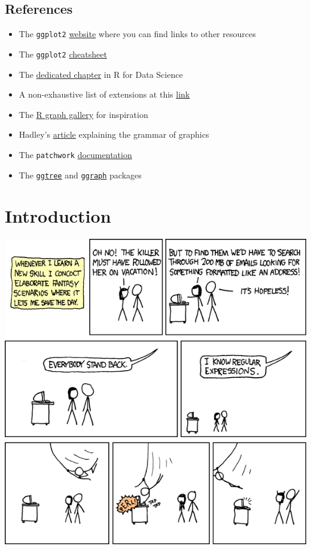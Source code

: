 \documentclass[]{book}
\providecommand{\tightlist}{%
  \setlength{\itemsep}{0pt}\setlength{\parskip}{0pt}}
\begin{document}
\hypertarget{references}{%
\section{References}\label{references}}

\begin{itemize}
\tightlist
\item
  The \texttt{ggplot2} \href{https://ggplot2.tidyverse.org/}{website} where you can find links to other resources
\item
  The \texttt{ggplot2} \href{https://rstudio.com/resources/cheatsheets/}{cheatsheet}
\item
  The \href{https://r4ds.had.co.nz/data-visualisation.html}{dedicated chapter} in R for Data Science
\item
  A non-exhaustive list of extensions at this \href{https://exts.ggplot2.tidyverse.org/gallery/}{link}
\item
  The \href{https://www.r-graph-gallery.com/}{R graph gallery} for inspiration
\item
  Hadley's \href{https://vita.had.co.nz/papers/layered-grammar.html}{article} explaining the grammar of graphics
\item
  The \texttt{patchwork} \href{https://patchwork.data-imaginist.com/}{documentation}
\item
  The \href{https://guangchuangyu.github.io/ggtree-book/chapter-ggtree.html}{\texttt{ggtree}} and \href{https://www.data-imaginist.com/2017/ggraph-introduction-layouts/}{\texttt{ggraph}} packages
\end{itemize}

\hypertarget{introduction}{%
\chapter{Introduction}\label{introduction}}

\includegraphics{06_regular_expressions.png}
\end{document}
